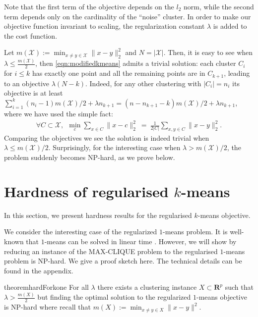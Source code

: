 \documentclass[12pt]{article}
\newcommand{\mc}{\mathcal}
\newcommand{\mb}{\mathbf}
\begin{document}
Note that the first term of the objective depends on the $l_2$ norm, while the second term depends only on the cardinality of the ``noise'' cluster. In order to make our objective function invariant to scaling, the regularization constant $\lambda$ is added to the cost function. 

Let $m(\mc X) := \min_{x\ne y \in \mc X} \|x-y\|_2^2$ and $N = |\mc X|$. Then, it is easy to see when $\lambda \leq \frac{m(\mc X)}{2}$, then \eqref{eqn:modifiedkmeans} admits a trivial solution: each cluster $C_i$ for $i \leq k$ has exactly one point and all the remaining points are in $C_{k+1}$, leading to an objective $\lambda (N-k)$. Indeed, for any other clustering with $|C_i| = n_i$ its objective is at least $\sum_{i=1}^k (n_i-1) m(\mc X)/2 + \lambda n_{k+1} = (n-n_{k+1} - k) m(\mc X)/2 + \lambda n_{k+1}$, where we have used the simple fact:
\begin{align}
\forall C \subset \mc X, ~~
\min_{c} \sum_{x \in C} \|x - c\|_2^2 ~=~ \frac{1}{2|C|}\sum_{x, y \in C} \|x - y\|_2^2.
\end{align}
Comparing the objectives we see the solution is indeed trivial when $\lambda \leq m(\mc X) /2$. Surprisingly, for the interesting case when $\lambda > m(\mc X) /2$, the problem suddenly becomes NP-hard, as we prove below.





\section{Hardness of regularised $k$-means}
\label{section:hardness}

In this section, we present hardness results for the regularised $k$-means objective. 

We consider the interesting case of the regularized $1$-means problem. It is well-known that $1$-means can be solved in linear time \cite{Bellman73}. However, we will show by reducing an instance of the MAX-CLIQUE problem to the regularised $1$-means problem is NP-hard. We give a proof sketch here. The technical details can be found in the appendix.

\begin{restatable}{theorem}{hardForkone}
\label{theorem:hardFork1}
For all $\lambda$ there exists a clustering instance $ X \subset \mb R^p$ such that $\lambda > \frac{m(X)}{2}$ but finding the optimal solution to the regularized $1$-means objective is NP-hard where recall that $m(X) := \min_{x\ne y \in X} \|x-y\|^2$.
\end{restatable}
\end{document}
